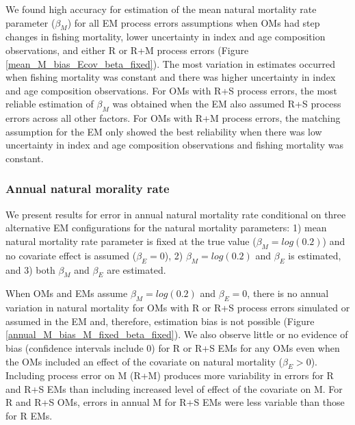 \documentclass[
  12pt,
]{article}
\begin{document}
We found high accuracy for estimation of the mean natural mortality rate parameter (\(\beta_M\)) for all EM process errors assumptions when OMs had step changes in fishing mortality, lower uncertainty in index and age composition observations, and either R or R+M process errors (Figure \ref{mean_M_bias_Ecov_beta_fixed}). The most variation in estimates occurred when fishing mortality was constant and there was higher uncertainty in index and age composition observations. For OMs with R+S process errors, the most reliable estimation of \(\beta_M\) was obtained when the EM also assumed R+S process errors across all other factors. For OMs with R+M process errors, the matching assumption for the EM only showed the best reliability when there was low uncertainty in index and age composition observations and fishing mortality was constant.

\hypertarget{annual-natural-morality-rate}{%
\subsubsection*{Annual natural morality rate}\label{annual-natural-morality-rate}}

We present results for error in annual natural mortality rate conditional on three alternative EM configurations for the natural mortality parameters: 1) mean natural mortality rate parameter is fixed at the true value (\(\beta_M = log(0.2)\)) and no covariate effect is assumed (\(\beta_E = 0\)), 2) \(\beta_M = log(0.2)\) and \(\beta_E\) is estimated, and 3) both \(\beta_M\) and \(\beta_E\) are estimated.

When OMs and EMs assume \(\beta_M = log(0.2)\) and \(\beta_E = 0\), there is no annual variation in natural mortality for OMs with R or R+S process errors simulated or assumed in the EM and, therefore, estimation bias is not possible (Figure \ref{annual_M_bias_M_fixed_beta_fixed}). We also observe little or no evidence of bias (confidence intervals include 0) for R or R+S EMs for any OMs even when the OMs included an effect of the covariate on natural mortality (\(\beta_E > 0\)). Including process error on M (R+M) produces more variability in errors for R and R+S EMs than including increased level of effect of the covariate on M. For R and R+S OMs, errors in annual M for R+S EMs were less variable than those for R EMs.
\end{document}
